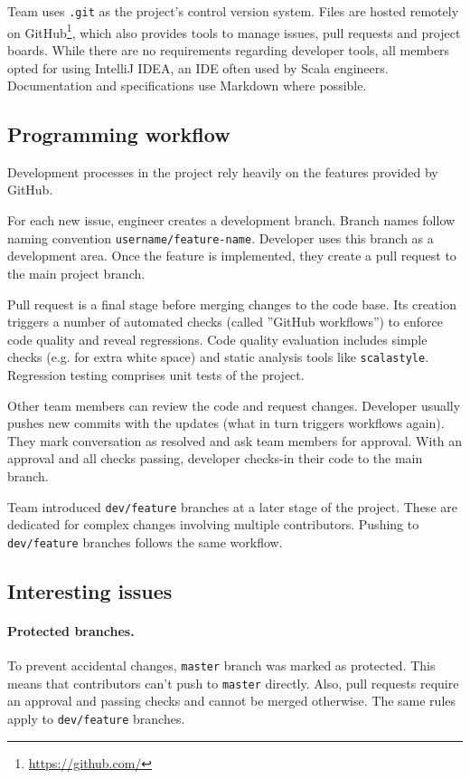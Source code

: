 Team uses \texttt{.git} as the project's control version system.
Files are hosted remotely on GitHub\footnote{\href{https://github.com/}{https://github.com/}}, which also provides tools to manage issues, pull requests and project boards.
While there are no requirements regarding developer tools, all members opted for using IntelliJ IDEA, an IDE often used by Scala engineers.
Documentation and specifications use Markdown where possible.

\subsection{Programming workflow}

Development processes in the project rely heavily on the features provided by GitHub.

For each new issue, engineer creates a development branch. Branch names follow naming convention \texttt{username/feature-name}.
Developer uses this branch as a development area.
Once the feature is implemented, they create a pull request to the main project branch.

Pull request is a final stage before merging changes to the code base.
Its creation triggers a number of automated checks (called ''GitHub workflows'') to enforce code quality and reveal regressions.
Code quality evaluation includes simple checks (e.g. for extra white space) and static analysis tools like \texttt{scalastyle}.
Regression testing comprises unit tests of the project.

Other team members can review the code and request changes.
Developer usually pushes new commits with the updates (what in turn triggers workflows again).
They mark conversation as resolved and ask team members for approval.
With an approval and all checks passing, developer checks-in their code to the main branch.

Team introduced \texttt{dev/feature} branches at a later stage of the project.
These are dedicated for complex changes involving multiple contributors.
Pushing to \texttt{dev/feature} branches follows the same workflow.

\subsection{Interesting issues}

\paragraph{Protected branches.}
To prevent accidental changes, \texttt{master} branch was marked as protected.
This means that contributors can't push to \texttt{master} directly.
Also, pull requests require an approval and passing checks and cannot be merged otherwise.
The same rules apply to \texttt{dev/feature} branches.


